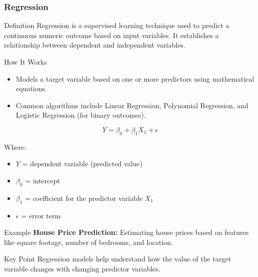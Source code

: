 \documentclass{beamer}
\begin{document}
\begin{frame}[fragile]
    \frametitle{Regression}
    \begin{block}{Definition}
        Regression is a supervised learning technique used to predict a continuous numeric outcome based on input variables. It establishes a relationship between dependent and independent variables.
    \end{block}
    
    \begin{block}{How It Works}
        \begin{itemize}
            \item Models a target variable based on one or more predictors using mathematical equations.
            \item Common algorithms include Linear Regression, Polynomial Regression, and Logistic Regression (for binary outcomes).
        \end{itemize}
    \end{block}
    
    \begin{equation}
        Y = \beta_0 + \beta_1X_1 + \epsilon
    \end{equation}
    
    Where:
    \begin{itemize}
        \item \( Y \) = dependent variable (predicted value)
        \item \( \beta_0 \) = intercept
        \item \( \beta_1 \) = coefficient for the predictor variable \( X_1 \)
        \item \( \epsilon \) = error term
    \end{itemize}
    
    \begin{block}{Example}
        \textbf{House Price Prediction:} Estimating house prices based on features like square footage, number of bedrooms, and location.
    \end{block}
    
    \begin{block}{Key Point}
        Regression models help understand how the value of the target variable changes with changing predictor variables.
    \end{block}
\end{frame}
\end{document}
